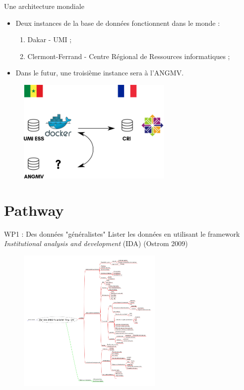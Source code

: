 \documentclass[newPxFont]{beamer}
\begin{document}
\begin{frame}[c]{Une architecture mondiale}
\vspace{-1cm}
\begin{itemize}
	\item Deux instances de la base de données fonctionnent dans le monde :
	\begin{enumerate}
		\item Dakar - UMI ;
		\item Clermont-Ferrand - Centre Régional de Ressources informatiques ;
	\end{enumerate}
	\item Dans le futur, une troisième instance sera à l'ANGMV.
\end{itemize}
\begin{figure}
	\centering
	\includegraphics[height=5cm]{img/sch_database}
\end{figure}
\end{frame}


\section{Pathway}


\begin{frame}[c]{WP1 : Des données "généralistes"}
\vspace{-2em}
Lister les données en utilisant le framework \textit{Institutional analysis and development} (IDA) (Ostrom 2009)
\vspace{-1em}
\begin{figure}
	\centering
	\includegraphics[width = 7cm]{img/IDA_data_org}
\end{figure}
\end{frame}
\end{document}
